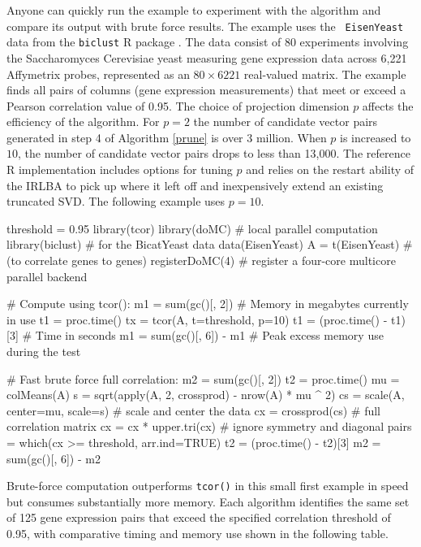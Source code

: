 \documentclass{article}
\let\proglang=\textsf
\numberwithin{algorithmctr}{section}
\begin{document}
Anyone can quickly run the example to experiment with the algorithm and
compare its output with brute force results. The example uses the {\tt
EisenYeast} data from the {\tt biclust} \proglang{R} package \cite{biclust}.
The data consist of 80 experiments involving the
Saccharomyces Cerevisiae yeast measuring gene expression data across 6,221
Affymetrix probes, represented as an $80\times 6221$ real-valued matrix.  The
example finds all pairs of columns (gene expression measurements) that meet or exceed a
Pearson correlation value of 0.95. The choice of projection dimension $p$ affects
the efficiency of the algorithm. For $p=2$ the number of candidate vector pairs
generated in step 4 of Algorithm \ref{prune} is over 3 million. When $p$ is increased
to $10$, the number of candidate vector pairs drops to less than 13,000.
The reference \proglang{R} implementation includes options for
tuning $p$ and relies on the restart ability of the IRLBA to pick up where it left off and
inexpensively extend an existing truncated SVD. The following example uses $p=10$.
\begin{small}
\begin{Schunk}
\begin{Sinput}
threshold = 0.95
library(tcor)
library(doMC)     # local parallel computation
library(biclust)  # for the BicatYeast data
data(EisenYeast)
A = t(EisenYeast) # (to correlate genes to genes)
registerDoMC(4)   # register a four-core multicore parallel backend

# Compute using tcor():
m1  = sum(gc()[, 2])  # Memory in megabytes currently in use
t1  = proc.time()
tx  = tcor(A, t=threshold, p=10)
t1  = (proc.time() - t1)[3]  # Time in seconds
m1  = sum(gc()[, 6]) - m1    # Peak excess memory use during the test

# Fast brute force full correlation:
m2  = sum(gc()[, 2])
t2  = proc.time()
mu = colMeans(A)
s  = sqrt(apply(A, 2, crossprod) - nrow(A) * mu ^ 2)
cs = scale(A, center=mu, scale=s)  # scale and center the data
cx = crossprod(cs)                 # full correlation matrix
cx  = cx * upper.tri(cx)           # ignore symmetry and diagonal
pairs = which(cx >= threshold, arr.ind=TRUE)
t2  = (proc.time() - t2)[3]
m2  = sum(gc()[, 6]) - m2
\end{Sinput}
\end{Schunk}
\end{small}
Brute-force computation outperforms {\tt tcor()} in this small first example in
speed but consumes substantially more memory.  Each algorithm identifies the
same set of 125 gene expression pairs that exceed the specified correlation
threshold of 0.95, with comparative timing and memory use shown in the
following table.
\end{document}
